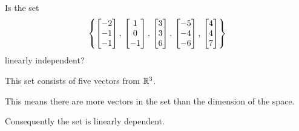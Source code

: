 \documentclass{ximera}
\author{Robert Beezer}
\begin{document}
\begin{exercise}
  Is the set 
  \[
    \set{%
      \colvector{-2\\-1\\-1},\,
      \colvector{1\\0\\-1},\,
      \colvector{3\\3\\6},\,
      \colvector{-5\\-4\\-6},\,
      \colvector{4\\4\\7}%
    }
  \]
  linearly independent?

  \begin{hint}
    This set consists of five vectors from $\mathbb{R}^{3}$.
  \end{hint}

  \begin{hint}
    This means there are more vectors in the set than the dimension of the space.
  \end{hint}

  \begin{hint}
    Consequently the set is linearly dependent.
  \end{hint}
    
  \begin{multipleChoice}
  \end{multipleChoice}

\end{exercise}
\end{document}
